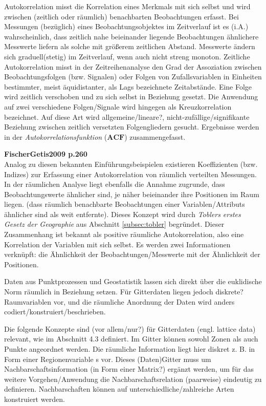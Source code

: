 Autokorrelation misst die Korrelation eines Merkmals mit sich selbst und wird zwischen (zeitlich oder räumlich) 
benachbarten Beobachtungen erfasst. Bei Messungen (bezüglich) eines Beobachtungsobjektes im Zeitverlauf ist es (i.A.) 
wahrscheinlich, dass zeitlich nahe beieinander liegende Beobachtungen ähnlichere Messwerte liefern als solche mit 
größerem zeitlichen Abstand. Messwerte ändern sich graduell(stetig) im Zeitverlauf, wenn auch nicht streng monoton. 
Zeitliche Autokorrelation misst in der Zeitreihenanalyse den Grad der Assoziation zwischen Beobachtungsfolgen 
(bzw. Signalen) oder Folgen von Zufallsvariablen in Einheiten bestimmter, meist äquidistanter, als Lags bezeichnete 
Zeitabstände. Eine Folge wird zeitlich verschoben und zu sich selbst in Beziehung gesetzt. 
Die Anwendung auf zwei verschiedene Folgen/Signale wird hingegen als Kreuzkorrelation bezeichnet. 
Auf diese Art wird allgemeine/lineare?, nicht-zufällige/signifikante Beziehung zwischen zeitlich versetzten 
Folgengliedern gesucht. Ergebnisse werden in der \emph{Autokorrelationsfunktion} ($\mathbf{ACF}$) zusammengefasst.

\textbf{FischerGetis2009 p.260}\\

Analog zu diesen bekannten Einführungsbeispielen existieren Koeffizienten (bzw. Indizes) zur Erfassung einer 
Autokorrelation von räumlich verteilten Messungen. In der räumlichen Analyse liegt ebenfalls die Annahme zugrunde, 
dass Beobachtungswerte ähnlicher sind, je näher beieinander ihre Positionen im Raum liegen.
(dass räumlich benachbarte Beobachtungen einer Variablen/Attributs ähnlicher sind als weit entfernte). 
Dieses Konzept wird durch \emph{Toblers erstes Gesetz der Geographie} aus Abschnitt \ref{subsec:tobler} begründet. 
Dieser Zusammenhang ist bekannt als positive räumliche Autokorrelation, also eine Korrelation der Variablen mit sich selbst. 
Es werden zwei Informationen verknüpft: die Ähnlichkeit der Beobachtungen/Messwerte mit der Ähnlichkeit der Positionen. 


Daten aus Punktprozessen und Geostatistik lassen sich direkt über die euklidische Norm räumlich in Beziehung setzen. 
Für Gitterdaten liegen jedoch diskrete? Raumvariablen vor, und die räumliche Anordnung der Daten wird anders codiert/konstruiert/beschrieben.

Die folgende Konzepte sind (vor allem/nur?) für Gitterdaten (engl. lattice data) relevant, wie im Abschnitt 4.3 definiert. 
Im Gitter können sowohl Zonen als auch Punkte angeordnet werden. Die räumliche Information liegt hier diskret z. B. in Form 
einer Regionenvariable s vor. Dieses (Daten)Gitter muss um Nachbarschaftsinformation (in Form einer Matrix?) ergänzt werden, 
um für das weitere Vorgehen/Anwendung die Nachbarschaftsrelation (paarweise) eindeutig zu definieren. 
Nachbarschaften können auf unterschiedliche/zahlreiche Arten konstruiert werden. 

